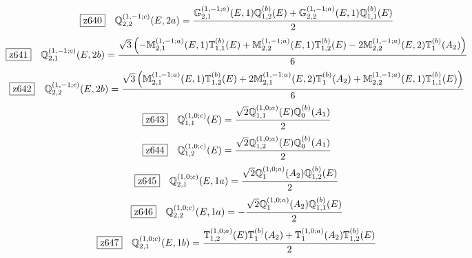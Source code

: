 \documentclass[fleqn,10pt,landscape]{jsarticle}
\begin{document}
\begin{dmath*}
\hspace*{3mm}\fbox{z640}\quad \mathbb{Q}_{2,2}^{(1,-1;c)}(E,2a)=\frac{\mathbb{G}_{2,1}^{(1,-1;a)}(E,1) \mathbb{Q}_{1,2}^{(b)}(E) + \mathbb{G}_{2,2}^{(1,-1;a)}(E,1) \mathbb{Q}_{1,1}^{(b)}(E)}{2}
\end{dmath*}
\begin{dmath*}
\hspace*{3mm}\fbox{z641}\quad \mathbb{Q}_{2,1}^{(1,-1;c)}(E,2b)=\frac{\sqrt{3} \left(- \mathbb{M}_{2,1}^{(1,-1;a)}(E,1) \mathbb{T}_{1,1}^{(b)}(E) + \mathbb{M}_{2,2}^{(1,-1;a)}(E,1) \mathbb{T}_{1,2}^{(b)}(E) - 2 \mathbb{M}_{2,2}^{(1,-1;a)}(E,2) \mathbb{T}_{1}^{(b)}(A_{2})\right)}{6}
\end{dmath*}
\begin{dmath*}
\hspace*{3mm}\fbox{z642}\quad \mathbb{Q}_{2,2}^{(1,-1;c)}(E,2b)=\frac{\sqrt{3} \left(\mathbb{M}_{2,1}^{(1,-1;a)}(E,1) \mathbb{T}_{1,2}^{(b)}(E) + 2 \mathbb{M}_{2,1}^{(1,-1;a)}(E,2) \mathbb{T}_{1}^{(b)}(A_{2}) + \mathbb{M}_{2,2}^{(1,-1;a)}(E,1) \mathbb{T}_{1,1}^{(b)}(E)\right)}{6}
\end{dmath*}
\begin{dmath*}
\hspace*{3mm}\fbox{z643}\quad \mathbb{Q}_{1,1}^{(1,0;c)}(E)=\frac{\sqrt{2} \mathbb{Q}_{1,1}^{(1,0;a)}(E) \mathbb{Q}_{0}^{(b)}(A_{1})}{2}
\end{dmath*}
\begin{dmath*}
\hspace*{3mm}\fbox{z644}\quad \mathbb{Q}_{1,2}^{(1,0;c)}(E)=\frac{\sqrt{2} \mathbb{Q}_{1,2}^{(1,0;a)}(E) \mathbb{Q}_{0}^{(b)}(A_{1})}{2}
\end{dmath*}
\begin{dmath*}
\hspace*{3mm}\fbox{z645}\quad \mathbb{Q}_{2,1}^{(1,0;c)}(E,1a)=\frac{\sqrt{2} \mathbb{Q}_{1}^{(1,0;a)}(A_{2}) \mathbb{Q}_{1,2}^{(b)}(E)}{2}
\end{dmath*}
\begin{dmath*}
\hspace*{3mm}\fbox{z646}\quad \mathbb{Q}_{2,2}^{(1,0;c)}(E,1a)=- \frac{\sqrt{2} \mathbb{Q}_{1}^{(1,0;a)}(A_{2}) \mathbb{Q}_{1,1}^{(b)}(E)}{2}
\end{dmath*}
\begin{dmath*}
\hspace*{3mm}\fbox{z647}\quad \mathbb{Q}_{2,1}^{(1,0;c)}(E,1b)=\frac{\mathbb{T}_{1,2}^{(1,0;a)}(E) \mathbb{T}_{1}^{(b)}(A_{2}) + \mathbb{T}_{1}^{(1,0;a)}(A_{2}) \mathbb{T}_{1,2}^{(b)}(E)}{2}
\end{dmath*}
\end{document}
